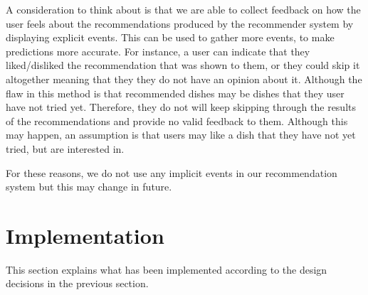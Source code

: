 A consideration to think about is that we are able to collect feedback on how the user feels about the recommendations produced by the recommender system by displaying explicit events. This can be used to gather more events, to make predictions more accurate. For instance, a user can indicate that they liked/disliked the recommendation that was shown to them, or they could skip it altogether meaning that they they do not have an opinion about it. Although the flaw in this method is that recommended dishes may be dishes that they user have not tried yet. Therefore, they do not will keep skipping through the results of the recommendations and provide no valid feedback to them. Although this may happen, an assumption is that users may like a dish that they have not yet tried, but are interested in. 

For these reasons, we do not use any implicit events in our recommendation system but this may change in future. 

\section{Implementation}

This section explains what has been implemented according to the design decisions in the previous section. 





